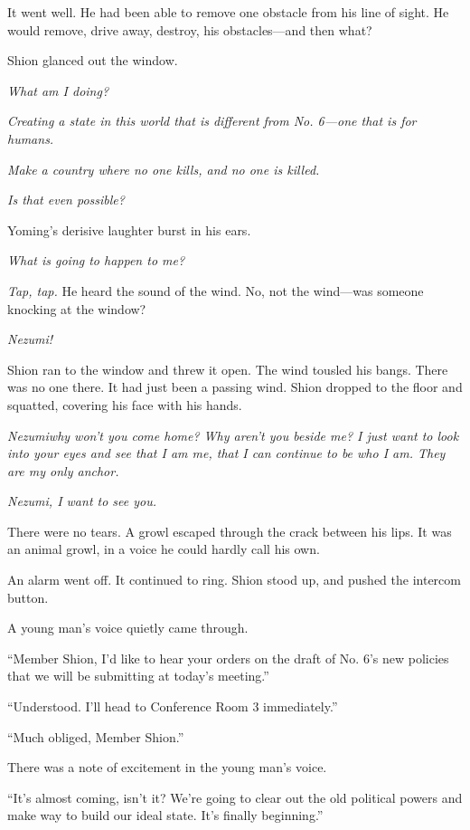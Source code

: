 It went well. He had been able to remove one obstacle from his line of
sight. He would remove, drive away, destroy, his obstacles---and then
what?

Shion glanced out the window.

\emph{What am I doing?}

\emph{Creating a state in this world that is different from No. 6---one that is
for humans.}

\emph{Make a country where no one kills, and no one is killed.}

\emph{Is that even possible?}

Yoming's derisive laughter burst in his ears.

\emph{What is going to happen to me?}

\myspace

\emph{Tap, tap.} He heard the sound of the wind. No, not the wind---was someone
knocking at the window?

\emph{Nezumi!}

Shion ran to the window and threw it open. The wind tousled his bangs.
There was no one there. It had just been a passing wind. Shion dropped
to the floor and squatted, covering his face with his hands.

\emph{Nezumi\el why won't you come home? Why aren't you beside me? I just want
to look into your eyes and see that I am me, that I can continue to be
who I am. They are my only anchor.}

\emph{Nezumi, I want to see you.}

There were no tears. A growl escaped through the crack between his lips.
It was an animal growl, in a voice he could hardly call his own.

An alarm went off. It continued to ring. Shion stood up, and
pushed the intercom button.

A young man's voice quietly came through.

``Member Shion, I'd like to hear your orders on the draft of No. 6's new
policies that we will be submitting at today's meeting.''

``Understood. I'll head to Conference Room 3 immediately.''

``Much obliged, Member Shion.''

There was a note of excitement in the young man's voice.

``It's almost coming, isn't it? We're going to clear out the old
political powers and make way to build our ideal state. It's finally
beginning.''

